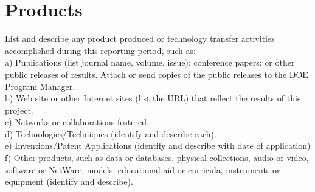 \documentclass[12pt]{article}
\begin{document}
\section{Products}
\label{sect::products}
List and describe any product produced or technology transfer activities accomplished during this reporting period, such as: \\
a)	Publications (list journal name, volume, issue); conference papers; or other public releases of results.  Attach or send copies of the public releases to the DOE Program Manager. \\
b)	Web site or other Internet sites (list the URL) that reflect the results of this project. \\
c)	Networks or collaborations fostered. \\
d)	Technologies/Techniques (identify and describe each). \\
e)	Inventions/Patent Applications (identify and describe with date of application) \\
f)	Other products, such as data or databases, physical collections, audio or video, software or NetWare, models, educational aid or curricula, instruments or equipment (identify and describe).





\appendix

\makeatletter
\def\@seccntformat#1{APPENDIX \csname the#1\endcsname.~}
\makeatother

%
%
%
\end{document}
